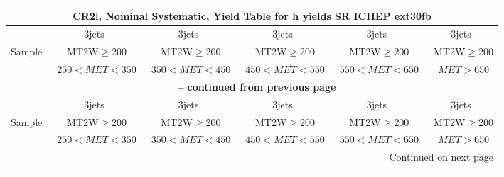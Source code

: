 \documentclass{article}
\begin{document}
\begin{longtable}{|l|c|c|c|c|c|} 
 
\multicolumn{6}{c}{ CR2l, Nominal Systematic, Yield Table for h yields SR ICHEP ext30fb }\\* \hline 
  & 3jets  & 3jets  & 3jets  & 3jets  & 3jets \\* 
Sample  & ~MT2W$\ge$200  & ~MT2W$\ge$200  & ~MT2W$\ge$200  & ~MT2W$\ge$200  & ~MT2W$\ge$200 \\* 
  & ~$250<MET<350$  & ~$350<MET<450$  & ~$450<MET<550$  & ~$550<MET<650$  & ~$MET>650$ \\* 
\hline \hline 
\endfirsthead 
 
\multicolumn{6}{c}{{\bfseries \tablename\ \thetable{} -- continued from previous page}}\\* \hline 
  & 3jets  & 3jets  & 3jets  & 3jets  & 3jets \\* 
Sample  & ~MT2W$\ge$200  & ~MT2W$\ge$200  & ~MT2W$\ge$200  & ~MT2W$\ge$200  & ~MT2W$\ge$200 \\* 
  & ~$250<MET<350$  & ~$350<MET<450$  & ~$450<MET<550$  & ~$550<MET<650$  & ~$MET>650$ \\* 
\hline \hline 
\endhead 
 
\multicolumn{6}{|r|}{{Continued on next page}}\\* \hline 
\endfoot 
 
 
\endlastfoot 
 

\end{longtable}
\end{document}
